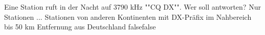     {Eine Station ruft in der Nacht auf 3790 kHz ""CQ DX"". Wer soll antworten? Nur Stationen ...}
    {Stationen von anderen Kontinenten}
    {mit DX-Präfix}
    {im Nahbereich bis 50 km Entfernung}
    {aus Deutschland}
    {false}{false}